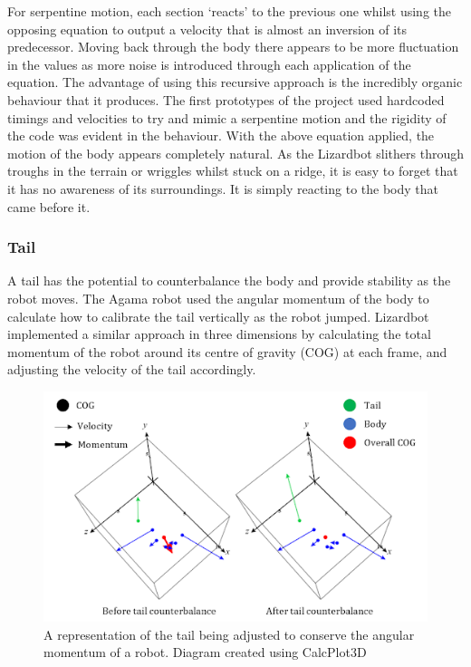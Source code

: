 \documentclass{article}
\begin{document}
For serpentine motion, each section ‘reacts’ to the previous one whilst using the opposing equation to output a velocity that is almost an inversion of its predecessor. Moving back through the body there appears to be more fluctuation in the values as more noise is introduced through each application of the equation. The advantage of using this recursive approach is the incredibly organic behaviour that it produces. The first prototypes of the project used hardcoded timings and velocities to try and mimic a serpentine motion and the rigidity of the code was evident in the behaviour. With the above equation applied, the motion of the body appears completely natural. As the Lizardbot slithers through troughs in the terrain or wriggles whilst stuck on a ridge, it is easy to forget that it has no awareness of its surroundings. It is simply reacting to the body that came before it.


\subsubsection{Tail}
\label{sec:Tail Imp}
A tail has the potential to counterbalance the body and provide stability as the robot moves. The Agama robot used the angular momentum of the body to calculate how to calibrate the tail vertically as the robot jumped. Lizardbot implemented a similar approach in three dimensions by calculating the total momentum of the robot around its centre of gravity (COG) at each frame, and adjusting the velocity of the tail accordingly.\\ 
\begin{figure}[H]
\centering
\includegraphics[scale=0.6]{tailMomentum}
\caption{A representation of the tail being adjusted to conserve the angular momentum of a robot. Diagram created using CalcPlot3D \citep{diagrams}}
\end{figure}
\end{document}
